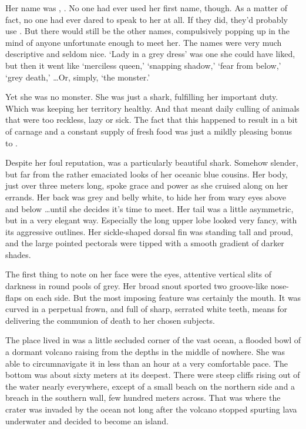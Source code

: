 Her name was \sharkname, \sharknamefull. No one had ever used her first name, though. As a matter of fact, no one had ever dared to speak to her at all. If they did, they'd probably use \sharknameformal. But there would still be the other names, compulsively popping up in the mind of anyone unfortunate enough to meet her. The names were very much descriptive and seldom nice. `Lady in a grey dress' was one she could have liked, but then it went like `merciless queen,' `snapping shadow,' `fear from below,' `grey death,' \dots Or, simply, `the monster.'

Yet she was no monster. She was just a shark, fulfilling her important duty. Which was keeping her territory healthy. And that meant daily culling of animals that were too reckless, lazy or sick. The fact that this happened to result in a bit of carnage and a constant supply of fresh food was just a mildly pleasing bonus to \sharknameformal.

Despite her foul reputation, \sharknameformal was a particularly beautiful shark. Somehow slender, but far from the rather emaciated looks of her oceanic blue cousins. Her body, just over three meters long, spoke grace and power as she cruised along on her errands. Her back was grey and belly white, to hide her from wary eyes above and below \dots until she decides it's time to meet. Her tail was a little asymmetric, but in a very elegant way. Especially the long upper lobe looked very fancy, with its aggressive outlines. Her sickle-shaped dorsal fin was standing tall and proud, and the large pointed pectorals were tipped with a smooth gradient of darker shades. 

The first thing to note on her face were the eyes, attentive vertical slits of darkness in round pools of grey. Her broad snout sported two groove-like nose-flaps on each side. But the most imposing feature was certainly the mouth. It was curved in a perpetual frown, and full of sharp, serrated white teeth, means for delivering the communion of death to her chosen subjects.

\mybreak

The place \sharknameformal lived in was a little secluded corner of the vast ocean, a flooded bowl of a dormant volcano raising from the depths in the middle of nowhere. She was able to circumnavigate it in less than an hour at a very comfortable pace. The bottom was about sixty meters at its deepest. There were steep cliffs rising out of the water nearly everywhere, except of a small beach on the northern side and a breach in the southern wall, few hundred meters across. That was where the crater was invaded by the ocean not long after the volcano stopped spurting lava underwater and decided to become an island.

